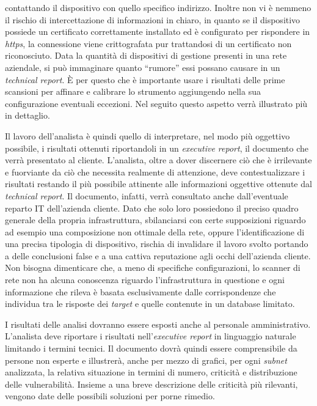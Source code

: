 \documentclass[target=mst,aauheader=]{thud}
\begin{document}
contattando il dispositivo con quello specifico indirizzo. Inoltre non vi è nemmeno il rischio di intercettazione di informazioni in chiaro, in quanto se il dispositivo possiede un certificato correttamente installato ed è configurato per rispondere in \textit{https}, la connessione viene crittografata pur trattandosi di un certificato non riconosciuto. Data la quantità di dispositivi di gestione presenti in una rete aziendale, si può immaginare quanto “rumore” essi possano causare in un \textit{technical report}. È per questo che è importante usare i risultati delle prime scansioni per affinare e calibrare lo strumento aggiungendo nella sua configurazione eventuali eccezioni. Nel seguito questo aspetto verrà illustrato più in dettaglio.

Il lavoro dell’analista è quindi quello di interpretare, nel modo più oggettivo possibile, i risultati ottenuti riportandoli in un \textit{executive report}, il documento che verrà presentato al cliente. L’analista, oltre a dover discernere ciò che è irrilevante e fuorviante da ciò che necessita realmente di attenzione, deve contestualizzare i risultati restando il più possibile attinente alle informazioni oggettive ottenute dal \textit{technical report}. Il documento, infatti, verrà consultato anche dall’eventuale reparto IT dell’azienda cliente. Dato che solo loro possiedono il preciso quadro generale della propria infrastruttura, sbilanciarsi con certe supposizioni riguardo ad esempio una composizione non ottimale della rete, oppure l’identificazione di una precisa tipologia di dispositivo, rischia di invalidare il lavoro svolto portando a delle conclusioni false e a una cattiva reputazione agli occhi dell’azienda cliente. Non bisogna dimenticare che, a meno di specifiche configurazioni, lo scanner di rete non ha alcuna conoscenza riguardo l’infrastruttura in questione e ogni informazione che rileva è basata esclusivamente dalle corrispondenze che individua tra le risposte dei \textit{target} e quelle contenute in un database limitato.

I risultati delle analisi dovranno essere esposti anche al personale amministrativo. L’analista deve riportare i risultati nell’\textit{executive report} in linguaggio naturale limitando i termini tecnici. Il documento dovrà quindi essere comprensibile da persone non esperte e illustrerà, anche per mezzo di grafici, per ogni \textit{subnet} analizzata, la relativa situazione in termini di numero, criticità e distribuzione delle vulnerabilità. Insieme a una breve descrizione delle criticità più rilevanti, vengono date delle possibili soluzioni per porne rimedio.
\end{document}
